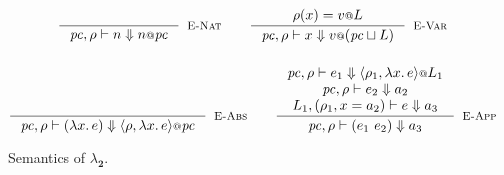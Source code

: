 \documentclass{article}
\makeatletter
\newcommand{\at}{\ensuremath{{\scriptstyle{@}}}}
\newcommand{\pc}{\ensuremath{{\mathit{pc}}}}
\theoremstyle{definition}
\makeatother
\begin{document}
\begin{figure}[h]
  \centering
  \begin{gather*}
    \inference{}{
      \pc, \rho |- n \Downarrow n \at \pc
    }[\textsc{E-Nat}]
    \qquad
    \inference{
      \rho(x) = v \at L
    }{
      \pc, \rho |- x \Downarrow v \at (\pc \sqcup L)
    }[\textsc{E-Var}]
    \\[3ex]
    \inference{}{
      \pc, \rho |- (\lambda{x}.\, e) \Downarrow
      \langle{\rho, \lambda{x}.\, e\rangle} \at \pc
    }[\textsc{E-Abs}]
    \qquad
    \inference{
      \pc, \rho |- e_1 \Downarrow
      \langle{\rho_1, \lambda{x}.\, e\rangle} \at L_1
      \\
      \pc, \rho |- e_2 \Downarrow a_2
      \\
      L_1, (\rho_1, x = a_2) |- e \Downarrow a_3
    }{
      \pc, \rho |- (e_1\ e_2) \Downarrow a_3
    }[\textsc{E-App}]
  \end{gather*}
  \caption{Semantics of $\lambda_{\mathbf{2}}$.}
  \label{fig:semantics}
\end{figure}

\pagebreak
\end{document}
